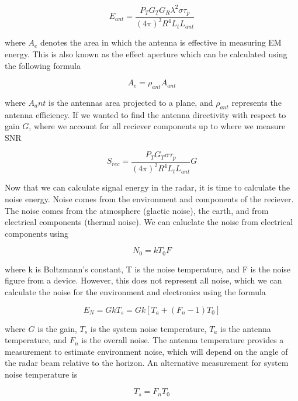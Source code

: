 \documentclass[12pt]{article}
\begin{document}
\begin{equation}
    E_{ant} = \frac{P_T G_T G_R \lambda^2 \sigma \tau_p}{(4 \pi)^3 R^4 L_t L_{ant}}
\end{equation}

where $A_e$ denotes the area in which the antenna is effective in measuring EM energy. This is also known as the effect aperture which can be calculated using the following formula

\begin{equation}
    A_{e} = \rho_{ant} A_{ant}
\end{equation}

where $A_ant$ is the antennas area projected to a plane, and $\rho_{ant}$ represents the antenna efficiency. If we wanted to find the antenna directivity with respect to gain $G$, where we account for all reciever components up to where we measure SNR

\begin{equation}
    S_{rec} = \frac{P_T G_T \sigma \tau_p}{(4 \pi)^2 R^4 L_t L_{ant}} G
\end{equation}

Now that we can calculate signal energy in the radar, it is time to calculate the noise energy. Noise comes from the environment and components of the reciever. The noise comes from the atmosphere (glactic noise), the earth, and from electrical components (thermal noise). We can caluclate the noise from electrical components using

\begin{equation}
    N_0 = kT_0F
\end{equation}

where k is Boltzmann's constant, T is the noise temperature, and F is the noise figure from a device. However, this does not represent all noise, which we can calculate the noise for the environment and electronics using the formula

\begin{equation}
    E_N =   GkT_s= Gk \left[ T_a + (F_n - 1) T_0\right]
\end{equation}

where $G$ is the gain, $T_s$ is the system noise temperature, $T_a$ is the antenna temperature, and $F_n$ is the overall noise. The antenna temperature provides a measurement to estimate environment noise, which will depend on the angle of the radar beam relative to the horizon. An alternative measurement for system noise temperature is 

\begin{equation}
    T_s = F_n T_0
\end{equation}
\end{document}
